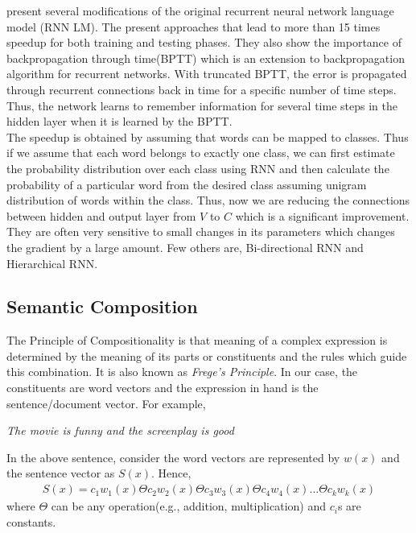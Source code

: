 \documentclass[11pt,a4paper]{article}
\begin{document}
\cite{Mikolov:11} present several modifications of the original recurrent neural network language model (RNN LM). The present approaches that lead to more than 15 times speedup for both training and testing phases. They also show the importance of backpropagation through time(BPTT) which is an extension to backpropagation algorithm for recurrent networks. With truncated BPTT, the error is propagated through recurrent connections back in time for a specific number of time steps. Thus, the network learns to remember information for several time steps in the hidden layer when it is learned by the BPTT.\\
The speedup is obtained by assuming that words can be mapped to classes. Thus if we assume that each word belongs to exactly one class, we can first estimate the probability distribution over each class using RNN and then calculate the probability of a particular word from the desired class assuming unigram distribution of words within the class. Thus, now we are reducing the connections between hidden and output layer from $V$ to $C$ which is a significant improvement.\\
They are often very sensitive to small changes in its parameters which changes the gradient by a large amount. Few others are, Bi-directional RNN and Hierarchical RNN.\\

\subsection{Semantic Composition}
\label{sec:composition}
The Principle of Compositionality is that meaning of a complex expression is determined by the meaning of its parts or constituents and the rules which guide this combination. It is also known as \emph{Frege's Principle}. In our case, the constituents are word vectors and the expression in hand is the sentence/document vector. For example,
\begin{center}
\emph{The movie is funny and the screenplay is good}
\end{center}
In the above sentence, consider the word vectors are represented by $w(x)$ and the sentence vector as $S(x)$. Hence,
\begin{align}
S(x) = c_1w_1(x) \Theta c_2w_2(x) \Theta c_3w_3(x) \Theta c_4w_4(x) \dots \Theta c_kw_k(x)
\end{align}
where $\Theta$ can be any operation(e.g., addition, multiplication) and $c_i$s are constants.
\end{document}
